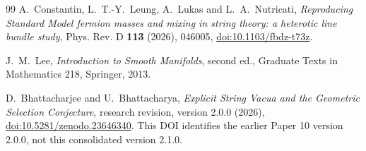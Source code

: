 \begin{thebibliography}{99}
A.~Constantin, L.~T.-Y.~Leung, A.~Lukas and L.~A.~Nutricati,
\emph{Reproducing Standard Model fermion masses and mixing in string theory:
a heterotic line bundle study}, Phys. Rev. D \textbf{113} (2026), 046005,
\href{https://doi.org/10.1103/fbdz-t73z}{doi:10.1103/fbdz-t73z}.

J.~M.~Lee, \emph{Introduction to Smooth Manifolds},
second ed., Graduate Texts in Mathematics 218, Springer, 2013.

D.~Bhattacharjee and U.~Bhattacharya,
\emph{Explicit String Vacua and the Geometric Selection Conjecture},
research revision, version 2.0.0 (2026),
\href{https://doi.org/10.5281/zenodo.23646340}{doi:10.5281/zenodo.23646340}.
This DOI identifies the earlier Paper 10 version 2.0.0, not this
consolidated version 2.1.0.
\end{thebibliography}
